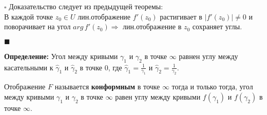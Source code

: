 $\square$
Доказательство следует из предыдущей теоремы:\\
В каждой точке $z_0 \in U$ лин.отображение $f'(z_0)$ растигивает в $|f'(z_0)|\neq 0$ и поворачивает на угол $arg\,f'(z_0)\Rightarrow$ лин.отображение в $z_0$ сохраняет углы. 

\hfill$\blacksquare$

\textbf{Определение:} Угол между кривыми $\gamma_1$ и $\gamma_2$ в точке $\infty$ равнен углу между касательными к $\hat{\gamma}_1$ и $\hat{\gamma}_2$ в точке 0, где $\hat{\gamma}_1 = \frac{1}{\gamma_1}$ и $\hat{\gamma}_2 = \frac{1}{\gamma_2}$.

Отображение $F$ называется \textbf{конформным} в точке $\infty$ тогда и только тогда, угол между кривыми $\gamma_1$ и $\gamma_2$ в точке $\infty$ равен углу между кривыми $f(\gamma_1)$ и $f(\gamma_2)$ в точке $\infty$.
